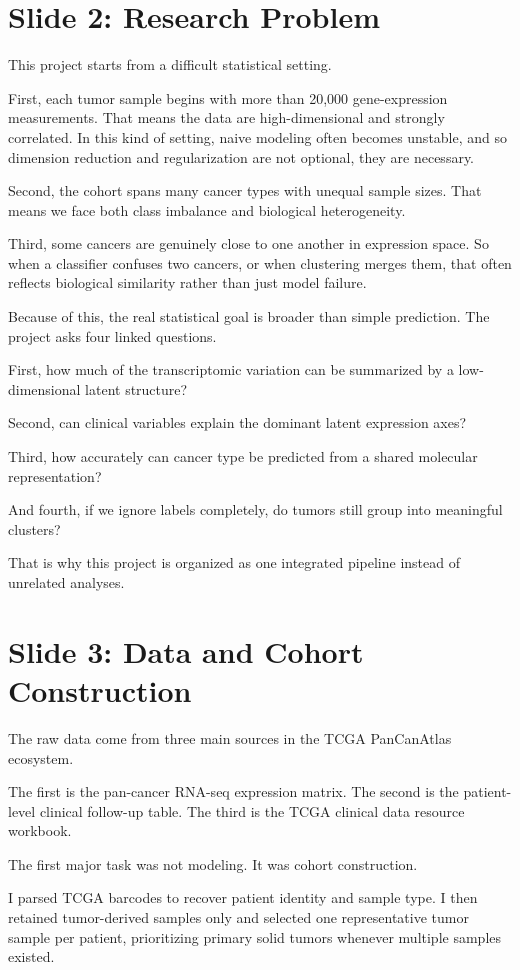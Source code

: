 \documentclass[12pt]{article}
\begin{document}
\section{Slide 2: Research Problem}
This project starts from a difficult statistical setting.

First, each tumor sample begins with more than 20,000 gene-expression measurements. That means the data are high-dimensional and strongly correlated. In this kind of setting, naive modeling often becomes unstable, and so dimension reduction and regularization are not optional, they are necessary.

Second, the cohort spans many cancer types with unequal sample sizes. That means we face both class imbalance and biological heterogeneity.

Third, some cancers are genuinely close to one another in expression space. So when a classifier confuses two cancers, or when clustering merges them, that often reflects biological similarity rather than just model failure.

Because of this, the real statistical goal is broader than simple prediction. The project asks four linked questions.

First, how much of the transcriptomic variation can be summarized by a low-dimensional latent structure?

Second, can clinical variables explain the dominant latent expression axes?

Third, how accurately can cancer type be predicted from a shared molecular representation?

And fourth, if we ignore labels completely, do tumors still group into meaningful clusters?

That is why this project is organized as one integrated pipeline instead of unrelated analyses.

\section{Slide 3: Data and Cohort Construction}
The raw data come from three main sources in the TCGA PanCanAtlas ecosystem.

The first is the pan-cancer RNA-seq expression matrix. The second is the patient-level clinical follow-up table. The third is the TCGA clinical data resource workbook.

The first major task was not modeling. It was cohort construction.

I parsed TCGA barcodes to recover patient identity and sample type. I then retained tumor-derived samples only and selected one representative tumor sample per patient, prioritizing primary solid tumors whenever multiple samples existed.
\end{document}
